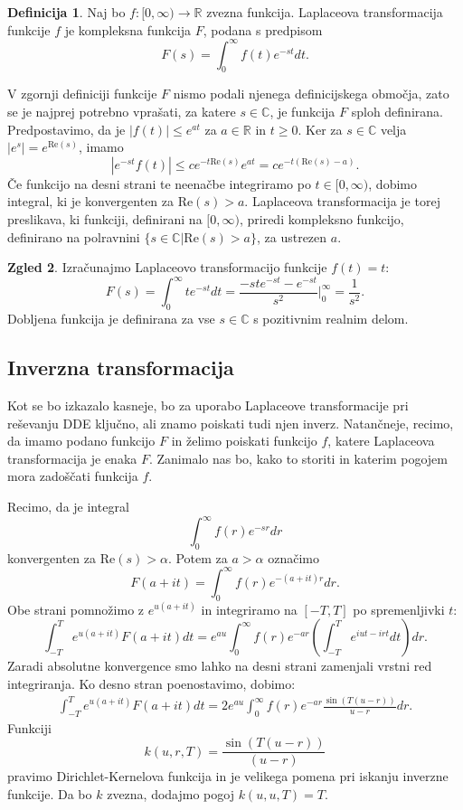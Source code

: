 \documentclass[12pt,a4paper]{amsart}
\theoremstyle{definition} %
\newtheorem{definicija}{Definicija}[section]
\newtheorem{zgled}[definicija]{Zgled}
\theoremstyle{plain} %
\newcommand{\R}{\mathbb R}
\newcommand{\C}{\mathbb C}
\begin{document}
\begin{definicija}
    Naj bo $f:[0,\infty) \to \R$ zvezna funkcija. Laplaceova transformacija funkcije $f$ je kompleksna funkcija
    $F$, podana s predpisom
    \[ F(s)=\int_{0}^{\infty}f(t)e^{-st}dt.\]
\end{definicija}

\noindent V zgornji definiciji funkcije $F$ nismo podali njenega definicijskega območja, zato se je
najprej potrebno vprašati, za katere $s\in\C$, je funkcija $F$ sploh definirana. Predpostavimo, da je
$|f(t)|\leq e^{at}$ za $a\in\R$ in $t\geq0$. Ker za $s\in\C$ velja $|e^{s}|=e^{\text{Re}(s)}$, imamo
\[|e^{-st}f(t)| \leq ce^{-t\text{Re}(s)}e^{at}=ce^{-t(\text{Re}(s)-a)}.\]
Če funkcijo na desni strani te neenačbe integriramo po $t\in [0,\infty)$, dobimo integral, ki je konvergenten za $\text{Re}(s)>a$.
Laplaceova transformacija je torej preslikava, ki funkciji, definirani na $[0,\infty)$, priredi
kompleksno funkcijo, definirano na polravnini $\{s\in\C | \text{Re}(s)>a\}$, za ustrezen $a$.

\begin{zgled}
    Izračunajmo Laplaceovo transformacijo funkcije $f(t)=t$:
    \[F(s)=\int_0^{\infty}te^{-st}dt = \frac{-ste^{-st}-e^{-st}}{s^2}\Bigr|_{0}^{\infty}=\frac{1}{s^2}.\]
    Dobljena funkcija je definirana za vse $s\in\C$ s pozitivnim realnim delom.
\end{zgled}

\subsection{Inverzna transformacija}
Kot se bo izkazalo kasneje, bo za uporabo Laplaceove transformacije pri reševanju DDE ključno, ali znamo poiskati tudi njen inverz.
Natančneje, recimo, da imamo podano funkcijo
$F$ in želimo poiskati funkcijo $f$, katere Laplaceova transformacija je enaka $F$.
Zanimalo nas bo, kako to storiti in katerim pogojem mora zadoščati funkcija $f$.

Recimo, da je integral 
\[\int_0^{\infty}f(r)e^{-sr}dr\]
konvergenten za $\text{Re}(s)>\alpha$. Potem za $a>\alpha$ označimo
\[F(a+it)=\int_0^{\infty}f(r)e^{-(a+it)r}dr.\]
Obe strani pomnožimo z $e^{u(a+it)}$ in integriramo na $[-T,T]$ po spremenljivki $t$:
\[\int_{-T}^{T}e^{u(a+it)}F(a+it)dt=e^{au}\int_0^{\infty}f(r)e^{-ar}\left(\int_{-T}^{T}e^{iut-irt}dt\right)dr.\]
Zaradi absolutne konvergence smo lahko na desni strani zamenjali vrstni red integriranja.
Ko desno stran poenostavimo, dobimo:
\begin{equation} \label{eq2}
    \begin{split}
        \int_{-T}^{T}e^{u(a+it)}F(a+it)dt=2e^{au}\int_0^{\infty}f(r)e^{-ar}\frac{\sin(T(u-r))}{u-r}dr.
    \end{split}
\end{equation}
Funkciji $$k(u,r,T)=\frac{\sin(T(u-r))}{(u-r)}$$ pravimo Dirichlet-Kernelova funkcija in je velikega pomena 
pri iskanju inverzne funkcije. Da bo $k$ zvezna, dodajmo pogoj $k(u,u,T)=T$. %
\end{document}
